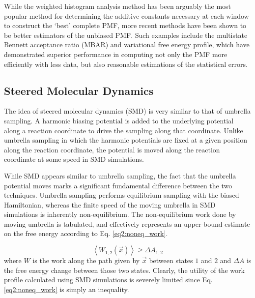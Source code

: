 While the weighted histogram analysis method has been arguably the most popular
method for determining the additive constants necessary at each window to
construct the `best' complete PMF, \cite{Grossfield_WHAM_2005} more recent
methods have been shown to be better estimators of the unbiased PMF. Such
examples include the multistate Bennett acceptance ratio (MBAR)
\cite{Shirts_JChemPhys_2008_v129_p124105} and variational free energy
profile, \cite{Lee_JChemTheoryComput_2013_v9_p153} which have demonstrated
superior performance in computing not only the PMF more efficiently with less
data, \cite{Lee_JChemTheoryComput_2013_v9_p153} but also reasonable estimations
of the statistical errors. \cite{Shirts_JChemPhys_2008_v129_p124105}

\subsection{Steered Molecular Dynamics}

The idea of steered molecular dynamics (SMD) is very similar to that of umbrella
sampling. A harmonic biasing potential is added to the underlying potential
along a reaction coordinate to drive the sampling along that coordinate. Unlike
umbrella sampling in which the harmonic potentials are fixed at a given position
along the reaction coordinate, the potential is moved along the reaction
coordinate at some speed in SMD simulations.

While SMD appears similar to umbrella sampling, the fact that the umbrella
potential moves marks a significant fundamental difference between the two
techniques. Umbrella sampling performs equilibrium sampling with the biased
Hamiltonian, whereas the finite speed of the moving umbrella in SMD simulations
is inherently non-equilibrium. \cite{Tuckerman_Book_StatMech_TheoryAndSim} The
non-equilibrium work done by moving umbrella is tabulated, and effectively
represents an upper-bound estimate on the free energy according to Eq.
\ref{eq2:noneq_work}. \cite{Tuckerman_Book_StatMech_TheoryAndSim}

\begin{equation}
   \left\langle W_{1,2}(\vec{x}) \right\rangle \geq \Delta A_{1,2}
   \label{eq2:noneq_work}
\end{equation}
where $W$ is the work along the path given by $\vec{x}$ between states $1$ and
$2$ and $\Delta A$ is the free energy change between those two states. Clearly,
the utility of the work profile calculated using SMD simulations is severely
limited since Eq. \ref{eq2:noneq_work} is simply an inequality.

